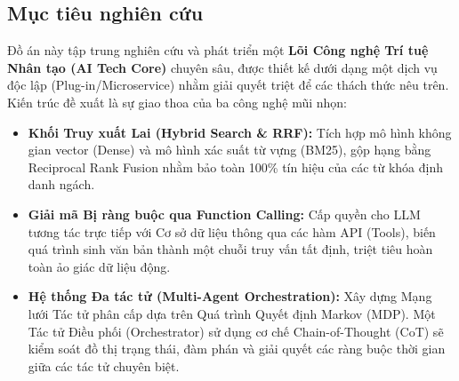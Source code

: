 \subsection{Mục tiêu nghiên cứu}

Đồ án này tập trung nghiên cứu và phát triển một \textbf{Lõi Công nghệ Trí tuệ Nhân tạo (AI Tech Core)} chuyên sâu, được thiết kế dưới dạng một dịch vụ độc lập (Plug-in/Microservice) nhằm giải quyết triệt để các thách thức nêu trên. Kiến trúc đề xuất là sự giao thoa của ba công nghệ mũi nhọn:

\begin{itemize}
    \item \textbf{Khối Truy xuất Lai (Hybrid Search \& RRF):} Tích hợp mô hình không gian vector (Dense) và mô hình xác suất từ vựng (BM25), gộp hạng bằng Reciprocal Rank Fusion nhằm bảo toàn 100\% tín hiệu của các từ khóa định danh ngách.
    \item \textbf{Giải mã Bị ràng buộc qua Function Calling:} Cấp quyền cho LLM tương tác trực tiếp với Cơ sở dữ liệu thông qua các hàm API (Tools), biến quá trình sinh văn bản thành một chuỗi truy vấn tất định, triệt tiêu hoàn toàn ảo giác dữ liệu động.
    \item \textbf{Hệ thống Đa tác tử (Multi-Agent Orchestration):} Xây dựng Mạng lưới Tác tử phân cấp dựa trên Quá trình Quyết định Markov (MDP). Một Tác tử Điều phối (Orchestrator) sử dụng cơ chế Chain-of-Thought (CoT) sẽ kiểm soát đồ thị trạng thái, đàm phán và giải quyết các ràng buộc thời gian giữa các tác tử chuyên biệt.
\end{itemize}
